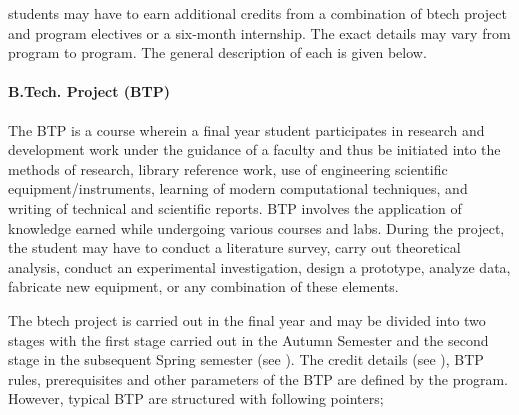 \Glspl{student} may have to earn additional credits from a combination of \acrshort{btech} project and program electives or a six-month internship. The exact details may vary from \gls{program} to \gls{program}. The general description of each is given below.

\paragraph{B.Tech. Project (BTP)} The BTP is a course wherein a final year \gls{student} participates in research and development work under the guidance of a \gls{faculty} and thus be initiated into the methods of research, library reference work, use of engineering scientific equipment/instruments, learning of modern computational techniques, and writing of technical and scientific reports. BTP involves the application of knowledge earned while undergoing various courses and labs. During the project, the \gls{student} may have to conduct a literature survey, carry out theoretical analysis, conduct an experimental investigation, design a prototype, analyze data, fabricate new equipment, or any combination of these elements.

The \acrshort{btech} project is carried out in the final year and may be divided into two stages with the first stage carried out in the Autumn Semester and the second stage in the subsequent Spring semester (see ). The credit details (see ), BTP rules, prerequisites and other parameters of the BTP are defined by the program. However, typical BTP are structured with following pointers; 

